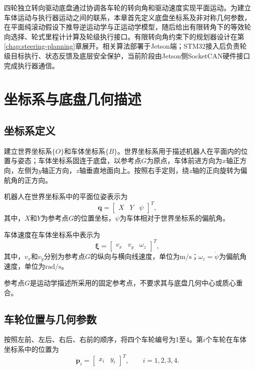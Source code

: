 \documentclass[UTF8,12pt,a4paper,openany]{ctexbook}
\begin{document}
四轮独立转向驱动底盘通过协调各车轮的转向角和驱动速度实现平面运动。为建立车体运动与执行器运动之间的联系，本章首先定义底盘坐标系及非对称几何参数，在平面纯滚动假设下推导逆运动学与正运动学模型，随后给出有限转角下的等效轮向选择、轮式里程计计算及轮级执行接口。有限转向角约束下的规划器设计在第\ref{chap:steering-planning}章展开。相关算法部署于Jetson端；STM32接入后负责轮级目标执行、状态反馈及底层安全保护，当前阶段由Jetson侧SocketCAN硬件接口完成执行器通信。

\section{坐标系与底盘几何描述}

\subsection{坐标系定义}

建立世界坐标系$\{O\}$和车体坐标系$\{B\}$。世界坐标系用于描述机器人在平面内的位置与姿态；车体坐标系固连于底盘，以参考点$G$为原点，车体前进方向为$x$轴正方向，左侧为$y$轴正方向，$z$轴垂直地面向上。按照右手定则，绕$z$轴的正向旋转为偏航角的正方向。

机器人在世界坐标系中的平面位姿表示为
\begin{equation}
    \boldsymbol{q}
    =
    \begin{bmatrix}
        X & Y & \psi
    \end{bmatrix}^{T},
    \label{eq:kc-pose}
\end{equation}
其中，$X$和$Y$为参考点$G$的位置坐标，$\psi$为车体相对于世界坐标系的偏航角。

车体速度在车体坐标系中表示为
\begin{equation}
    \boldsymbol{\xi}
    =
    \begin{bmatrix}
        v_x & v_y & \omega_z
    \end{bmatrix}^{T},
    \label{eq:kc-body-velocity}
\end{equation}
其中，$v_x$和$v_y$分别为参考点$G$的纵向与横向线速度，单位为$\mathrm{m/s}$；$\omega_z=\dot{\psi}$为偏航角速度，单位为$\mathrm{rad/s}$。

参考点$G$是运动学描述所采用的固定参考点，不要求其与底盘几何中心或质心重合。

\subsection{车轮位置与几何参数}

按照左前、左后、右后、右前的顺序，将四个车轮编号为1至4。第$i$个车轮在车体坐标系中的位置为
\begin{equation}
    \boldsymbol{p}_i
    =
    \begin{bmatrix}
        x_i & y_i
    \end{bmatrix}^{T},
    \qquad i=1,2,3,4.
    \label{eq:kc-wheel-position}
\end{equation}
\end{document}
